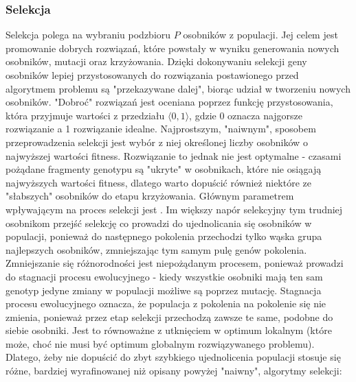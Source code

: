\subsubsection{Selekcja}
Selekcja polega na wybraniu podzbioru $ P $ osobników z populacji. Jej celem jest promowanie dobrych rozwiązań, które powstały w wyniku generowania nowych osobników, mutacji oraz krzyżowania. Dzięki dokonywaniu selekcji geny osobników lepiej przystosowanych do rozwiązania postawionego przed algorytmem problemu są "przekazywane dalej", biorąc udział w tworzeniu nowych osobników. "Dobroć" rozwiązań jest oceniana poprzez funkcję przystosowania, która przyjmuje wartości z przedziału $ \langle 0, 1 \rangle $, gdzie 0 oznacza najgorsze rozwiązanie a 1 rozwiązanie idealne.
Najprostszym, "naiwnym", sposobem przeprowadzenia selekcji jest wybór z niej określonej liczby osobników o najwyższej wartości fitness. Rozwiązanie to jednak nie jest optymalne - czasami pożądane fragmenty genotypu są "ukryte" w osobnikach, które nie osiągają najwyższych wartości fitness, dlatego warto dopuścić również niektóre ze "słabszych" osobników do etapu krzyżowania.
Głównym parametrem wpływającym na proces selekcji jest . Im większy napór selekcyjny tym trudniej osobnikom przejść selekcję co prowadzi do ujednolicania się osobników w populacji, ponieważ do następnego pokolenia przechodzi tylko wąska grupa najlepszych osobników, zmniejszając tym samym pulę genów pokolenia. Zmniejszanie się różnorodności jest niepożądanym procesem, ponieważ prowadzi do stagnacji procesu ewolucyjnego - kiedy wszystkie osobniki mają ten sam genotyp jedyne zmiany w populacji możliwe są poprzez mutację. Stagnacja procesu ewolucyjnego oznacza, że populacja z pokolenia na pokolenie się nie zmienia, ponieważ przez etap selekcji przechodzą zawsze te same, podobne do siebie osobniki. Jest to równoważne z utknięciem w optimum lokalnym (które może, choć nie musi być optimum globalnym rozwiązywanego problemu). Dlatego, żeby nie dopuścić do zbyt szybkiego ujednolicenia populacji stosuje się różne, bardziej wyrafinowanej niż opisany powyżej "naiwny", algorytmy selekcji:


